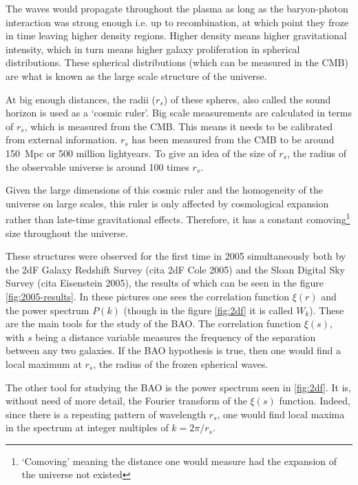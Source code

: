 The waves would propagate throughout the plasma as long as the baryon-photon interaction was strong enough i.e. up to recombination, at which point they froze in time leaving higher density regions. Higher density means higher gravitational intensity, which in turn means higher galaxy proliferation in spherical distributions. These spherical distributions (which can be measured in the CMB) are what is known as the large scale structure of the universe.

At big enough distances, the radii ($r_s$) of these spheres, also called the sound horizon is used as a `cosmic ruler'. Big scale measurements are calculated in terms of $r_s$, which is measured from the CMB. This means it needs to be calibrated from external information. $ r_s$ has been measured from the CMB to be around  \SI{150}{Mpc} or 500 million lightyears.
To give an idea of the size of $r_s$, the radius of the observable universe is around 100 times $r_s$.

Given the large dimensions of this cosmic ruler and the homogeneity of the universe on large scales, this ruler is only affected by cosmological expansion rather than late-time gravitational effects. Therefore, it has a constant comoving\footnote{`Comoving' meaning the distance one would measure had the expansion of the universe not existed} size throughout the universe.

These structures were observed for the first time in 2005 simultaneously both by the 2dF Galaxy Redshift Survey (cita 2dF Cole 2005) and the Sloan Digital Sky Survey (cita Eisenstein 2005), the results of which can be seen in the figure \ref{fig:2005-results}. In these pictures one sees the correlation function  $\xi(r)$ and the power spectrum $P(k)$ (though in the figure \ref{fig:2df} it is called $W_k$). These are the main tools for the study of the BAO.
The correlation function $\xi(s)$, with $s$ being a distance variable measures the frequency of the separation between any two galaxies. If the BAO hypothesis is true, then one would find a local maximum at $r_s$, the radius of the frozen spherical waves.

The other tool for studying the BAO is the power spectrum seen in \ref{fig:2df}. It is, without need of more detail, the Fourier transform of the $\xi(s)$ function. Indeed, since there is a repeating pattern of wavelength $r_s$, one would find local maxima in the spectrum at integer multiples of $k = 2\pi /r_s$.

